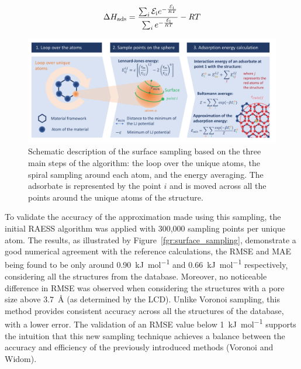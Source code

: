 \documentclass[main]{subfiles}
\begin{document}
\begin{equation}\label{eq:ads_enthalpy_3}
  \Delta H_{\text{ads}} = \dfrac{\sum_i \mathcal{E}_{\text{i}}e^{-\frac{\mathcal{E}_{\text{i}}}{RT}}}{\sum_i e^{-\frac{\mathcal{E}_{\text{i}}}{RT}}} - RT
\end{equation}

\begin{figure}[ht]
\centering

  \includegraphics[clip, trim=0.6cm 0.74cm 0.78cm 0.6cm,width=0.95\linewidth]{figures/3-fastsim/Principe_screening.pdf}
  \caption{Schematic description of the surface sampling based on the three main steps of the algorithm: the loop over the unique atoms, the spiral sampling around each atom, and the energy averaging. The adsorbate is represented by the point $i$ and is moved across all the points around the unique atoms of the structure.}\label{fgr:principle}
\end{figure}

To validate the accuracy of the approximation made using this sampling, the initial RAESS algorithm was applied with 300,000 sampling points per unique atom. The results, as illustrated by Figure~\ref{fgr:surface_sampling}, demonstrate a good numerical agreement with the reference calculations, {the RMSE and MAE being found to be only around \SI{0.90}{\kilo\joule\per\mole} and \SI{0.66}{\kilo\joule\per\mole} respectively}, considering all the structures from the database. Moreover, no noticeable difference in RMSE was observed when considering the structures with a pore size above \SI{3.7}{\angstrom} (as determined by the LCD). Unlike Voronoi sampling, this method provides consistent accuracy across all the structures of the database, with a lower error. The validation of an {RMSE} value below \SI{1}{\kilo\joule\per\mole} supports the intuition that this new sampling technique achieves a balance between the accuracy and efficiency of the previously introduced methods (Voronoi and Widom).
\end{document}
